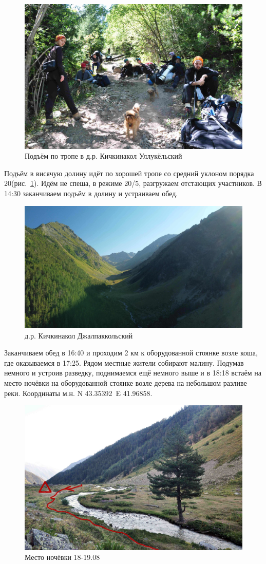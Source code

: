 \begin{figure}[h!]
	\centering
	\includegraphics[width=0.7\linewidth]{../pics/DSC_0436}
	\caption{Подъём по тропе в д.р. Кичкинакол Уллукёльский}
	\label{fig:DSC_0436}
\end{figure}

Подъём в висячую долину идёт по хорошей тропе со средний уклоном порядка 20\degree (рис.~\ref{fig:DSC_0436}). Идём не спеша, в режиме 20/5, разгружаем отстающих участников. В 14:30 заканчиваем подъём в долину и устраиваем обед.

\begin{figure}[h!]
	\centering
	\includegraphics[width=0.7\linewidth]{../pics/DJI_0805}
	\caption{д.р. Кичкинакол Джалпаккольский}
	\label{fig:kichkinakol}
\end{figure}

Заканчиваем обед в 16:40 и проходим 2 км к оборудованной стоянке возле коша, где оказываемся в 17:25. Рядом местные жители собирают малину. Подумав немного и устроив разведку, поднимаемся ещё немного выше и в 18:18 встаём на место ночёвки на оборудованной стоянке возле дерева на небольшом разливе реки. Координаты м.н. N 43.35392\degree~E 41.96858\degree.
\begin{figure}[h!]
	\centering
	\includegraphics[width=0.7\linewidth]{../pics/camp_18}
	\caption{Место ночёвки 18-19.08}
	\label{fig:camp_18}
\end{figure}


\clearpage